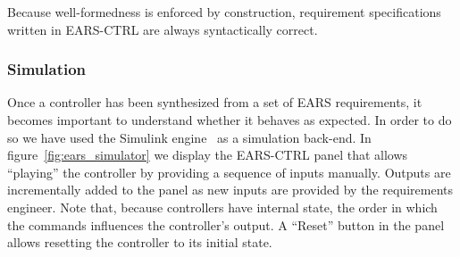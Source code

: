 Because well-formedness is enforced by construction, requirement specifications
written in \textsf{EARS-CTRL} are always syntactically correct.\vspace{-.4cm} 
\subsubsection{Simulation}
Once a controller has been synthesized from a set of EARS requirements, it
becomes important to understand whether it behaves as expected. In order to do
so we have used the Simulink engine~\cite{simulink} as a simulation back-end.
In figure~\ref{fig:ears_simulator} we display the \textsf{EARS-CTRL} panel that
allows ``playing'' the controller by providing a sequence of inputs manually.
Outputs are incrementally added to the panel as new inputs are provided by the
requirements engineer. Note that, because controllers have internal state,
the order in which the commands influences the controller's output. A ``Reset''
button in the panel allows resetting the controller to its initial
state.
\vspace{-.4cm}
